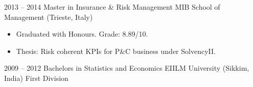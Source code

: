 \documentclass[
	a4paper,
]{fortysecondscv}
\begin{document}

\newpage
\makebacksidebar
		\begin{cvtable}[1.5]
			\cvitem
				{2013 -- 2014}
				{Master in Insurance \& Risk Management}
				{MIB School of Management (Trieste, Italy)}
				{	
					\begin{itemize}[nosep, leftmargin=0pt, label={}] %
						\item Graduated with Honours. Grade: 8.89/10.
						\item Thesis: Risk coherent KPIs for P\&C business under SolvencyII.
					\end{itemize}
				}
			\cvitem
				{2009 -- 2012}
				{Bachelors in Statistics and Economics}
				{EIILM University (Sikkim, India)}
				{First Division}
		\end{cvtable}
\end{document}
